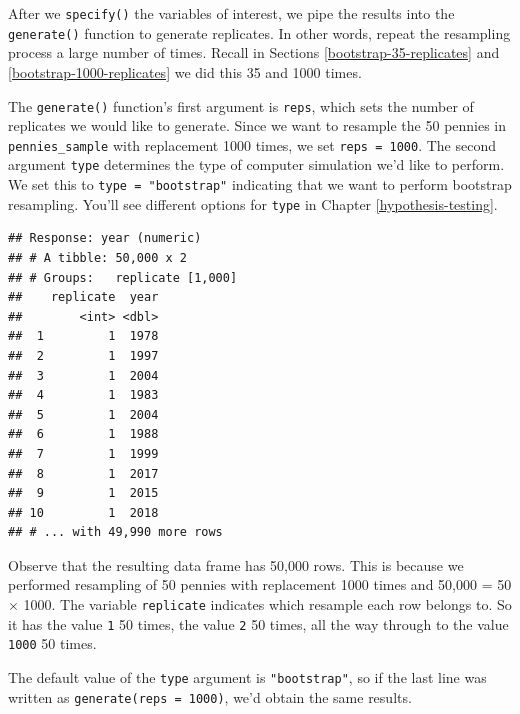 \documentclass[
]{book}
\newenvironment{Shaded}{\begin{snugshade}}{\end{snugshade}}
\newcommand{\DataTypeTok}[1]{\textcolor[rgb]{0.13,0.29,0.53}{#1}}
\newcommand{\DecValTok}[1]{\textcolor[rgb]{0.00,0.00,0.81}{#1}}
\newcommand{\KeywordTok}[1]{\textcolor[rgb]{0.13,0.29,0.53}{\textbf{#1}}}
\newcommand{\NormalTok}[1]{#1}
\newcommand{\OperatorTok}[1]{\textcolor[rgb]{0.81,0.36,0.00}{\textbf{#1}}}
\newcommand{\StringTok}[1]{\textcolor[rgb]{0.31,0.60,0.02}{#1}}
\begin{document}
After we \texttt{specify()} the variables of interest, we pipe the results into the \texttt{generate()} function to generate replicates. In other words, repeat the resampling process a large number of times. Recall in Sections \ref{bootstrap-35-replicates} and \ref{bootstrap-1000-replicates} we did this 35 and 1000 times.

The \texttt{generate()}  function's first argument is \texttt{reps}, which sets the number of replicates we would like to generate. Since we want to resample the 50 pennies in \texttt{pennies\_sample} with replacement 1000 times, we set \texttt{reps\ =\ 1000}. The second argument \texttt{type} determines the type of computer simulation we'd like to perform. We set this to \texttt{type\ =\ "bootstrap"} indicating that we want to perform bootstrap resampling. You'll see different options for \texttt{type} in Chapter \ref{hypothesis-testing}.

\begin{Shaded}
\end{Shaded}

\begin{verbatim}
## Response: year (numeric)
## # A tibble: 50,000 x 2
## # Groups:   replicate [1,000]
##    replicate  year
##        <int> <dbl>
##  1         1  1978
##  2         1  1997
##  3         1  2004
##  4         1  1983
##  5         1  2004
##  6         1  1988
##  7         1  1999
##  8         1  2017
##  9         1  2015
## 10         1  2018
## # ... with 49,990 more rows
\end{verbatim}

Observe that the resulting data frame has 50,000 rows. This is because we performed resampling of 50 pennies with replacement 1000 times and 50,000 = 50 \(\times\) 1000. The variable \texttt{replicate} indicates which resample each row belongs to. So it has the value \texttt{1} 50 times, the value \texttt{2} 50 times, all the way through to the value \texttt{1000} 50 times.

The default value of the \texttt{type} argument is \texttt{"bootstrap"}, so if the last line was written as \texttt{generate(reps\ =\ 1000)}, we'd obtain the same results.
\end{document}
